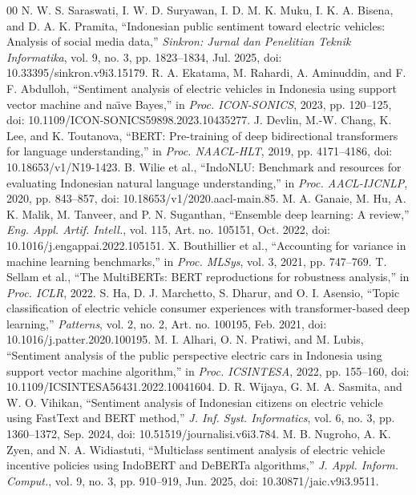 \begin{thebibliography}{00}
 N. W. S. Saraswati, I. W. D. Suryawan, I. D. M. K. Muku, I. K. A. Bisena, and D. A. K. Pramita, ``Indonesian public sentiment toward electric vehicles: Analysis of social media data,'' \emph{Sinkron: Jurnal dan Penelitian Teknik Informatika}, vol. 9, no. 3, pp. 1823--1834, Jul. 2025, doi: 10.33395/sinkron.v9i3.15179.
 R. A. Ekatama, M. Rahardi, A. Aminuddin, and F. F. Abdulloh, ``Sentiment analysis of electric vehicles in Indonesia using support vector machine and na\"{\i}ve Bayes,'' in \emph{Proc. ICON-SONICS}, 2023, pp. 120--125, doi: 10.1109/ICON-SONICS59898.2023.10435277.
 J. Devlin, M.-W. Chang, K. Lee, and K. Toutanova, ``BERT: Pre-training of deep bidirectional transformers for language understanding,'' in \emph{Proc. NAACL-HLT}, 2019, pp. 4171--4186, doi: 10.18653/v1/N19-1423.
 B. Wilie et al., ``IndoNLU: Benchmark and resources for evaluating Indonesian natural language understanding,'' in \emph{Proc. AACL-IJCNLP}, 2020, pp. 843--857, doi: 10.18653/v1/2020.aacl-main.85.
 M. A. Ganaie, M. Hu, A. K. Malik, M. Tanveer, and P. N. Suganthan, ``Ensemble deep learning: A review,'' \emph{Eng. Appl. Artif. Intell.}, vol. 115, Art. no. 105151, Oct. 2022, doi: 10.1016/j.engappai.2022.105151.
 X. Bouthillier et al., ``Accounting for variance in machine learning benchmarks,'' in \emph{Proc. MLSys}, vol. 3, 2021, pp. 747--769.
 T. Sellam et al., ``The MultiBERTs: BERT reproductions for robustness analysis,'' in \emph{Proc. ICLR}, 2022.
 S. Ha, D. J. Marchetto, S. Dharur, and O. I. Asensio, ``Topic classification of electric vehicle consumer experiences with transformer-based deep learning,'' \emph{Patterns}, vol. 2, no. 2, Art. no. 100195, Feb. 2021, doi: 10.1016/j.patter.2020.100195.
 M. I. Alhari, O. N. Pratiwi, and M. Lubis, ``Sentiment analysis of the public perspective electric cars in Indonesia using support vector machine algorithm,'' in \emph{Proc. ICSINTESA}, 2022, pp. 155--160, doi: 10.1109/ICSINTESA56431.2022.10041604.
 D. R. Wijaya, G. M. A. Sasmita, and W. O. Vihikan, ``Sentiment analysis of Indonesian citizens on electric vehicle using FastText and BERT method,'' \emph{J. Inf. Syst. Informatics}, vol. 6, no. 3, pp. 1360--1372, Sep. 2024, doi: 10.51519/journalisi.v6i3.784.
 M. B. Nugroho, A. K. Zyen, and N. A. Widiastuti, ``Multiclass sentiment analysis of electric vehicle incentive policies using IndoBERT and DeBERTa algorithms,'' \emph{J. Appl. Inform. Comput.}, vol. 9, no. 3, pp. 910--919, Jun. 2025, doi: 10.30871/jaic.v9i3.9511.

\end{thebibliography}
